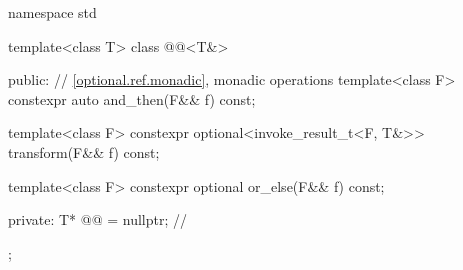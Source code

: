 \begin{codeblock}
namespace std {
  template<class T>
  class @@<T&> {
  public:
    // \ref{optional.ref.monadic}, monadic operations
    template<class F> constexpr auto and_then(F&& f) const;

    template<class F> constexpr optional<invoke_result_t<F, T&>> transform(F&& f) const;

    template<class F> constexpr optional or_else(F&& f) const;

  private:
    T* @@ = nullptr; // \expos
  };
}
\end{codeblock}
